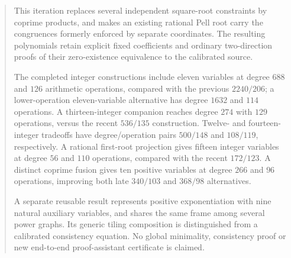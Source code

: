 \begin{abstract}
This iteration replaces several independent square-root constraints by
coprime products, and makes an existing rational Pell root carry the
congruences formerly enforced by separate coordinates. The resulting
polynomials retain explicit fixed coefficients and ordinary two-direction
proofs of their zero-existence equivalence to the calibrated source.

The completed integer constructions include eleven variables at degree
$688$ and $126$ arithmetic operations, compared with the previous
$2240/206$; a lower-operation eleven-variable alternative has degree
$1632$ and $114$ operations. A thirteen-integer companion reaches degree
$274$ with $129$ operations, versus the recent $536/135$ construction.
Twelve- and fourteen-integer tradeoffs have degree/operation pairs
$500/148$ and $108/119$, respectively.
A rational first-root projection gives fifteen
integer variables at degree $56$ and $110$ operations, compared with the
recent $172/123$. A distinct coprime fusion gives ten positive variables
at degree $266$ and $96$ operations, improving both late $340/103$ and
$368/98$ alternatives.

A separate reusable result represents positive exponentiation with nine
natural auxiliary variables, and shares the same frame among several
power graphs. Its generic tiling composition is distinguished from a
calibrated consistency equation. No global minimality, consistency proof
or new end-to-end proof-assistant certificate is claimed.
\end{abstract}
